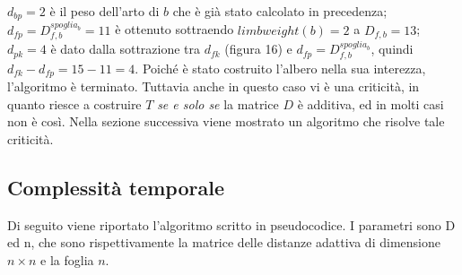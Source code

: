 \newline
$d_{bp}=2$ è il peso dell'arto di $b$ che è già stato calcolato in precedenza; $d_{fp}=D^{spoglia_{b}}_{f,b}=11$ è ottenuto sottraendo $limbweight(b)=2$ a $D_{f,b}=13$; $d_{pk}=4$ è dato dalla sottrazione tra $d_{fk}$ (figura 16) e $d_{fp}=D^{spoglia_{b}}_{f,b}$, quindi $d_{fk}-d_{fp}=15-11=4$.
\newline
Poiché è stato costruito l'albero nella sua interezza, l'algoritmo è terminato. Tuttavia anche in questo caso vi è una criticità, in quanto riesce a costruire $T$ \textit{se e solo se} la matrice $D$ è additiva, ed in molti casi non è così.
\newline
Nella sezione successiva viene mostrato un algoritmo che risolve tale criticità.

\newpage
\subsection{Complessità temporale}
Di seguito viene riportato l'algoritmo scritto in pseudocodice. I parametri sono D ed n, che sono rispettivamente la matrice delle distanze adattiva di dimensione $n \times n$ e la foglia $n$.

